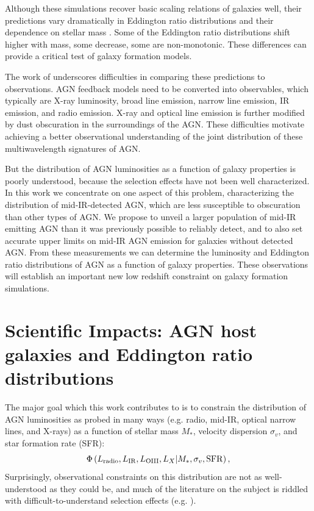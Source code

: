\documentclass[12pt, preprint]{hacked-aastex}
\begin{document}
Although these simulations recover basic scaling relations of galaxies
well, their predictions vary dramatically in Eddington ratio
distributions and their dependence on stellar mass
\cite{habouzit22a}. Some of the Eddington ratio distributions shift
higher with mass, some decrease, some are non-monotonic.  These
differences can provide a critical test of galaxy formation models.

The work of \cite{habouzit22a} underscores difficulties in comparing
these predictions to observations. AGN feedback models need to be
converted into observables, which typically are X-ray luminosity,
broad line emission, narrow line emission, IR emission, and radio
emission. X-ray and optical line emission is further modified by dust
obscuration in the surroundings of the AGN. These difficulties
motivate achieving a better observational understanding of the joint
distribution of these multiwavelength signatures of AGN.

But the distribution of AGN luminosities as a function of galaxy
properties is poorly understood, because the selection effects have
not been well characterized. In this work we concentrate on one aspect
of this problem, characterizing the distribution of mid-IR-detected
AGN, which are less susceptible to obscuration than other types of
AGN.  We propose to unveil a larger population of mid-IR emitting AGN
than it was previously possible to reliably detect, and to also set
accurate upper limits on mid-IR AGN emission for galaxies without
detected AGN. From these measurements we can determine the luminosity
and Eddington ratio distributions of AGN as a function of galaxy
properties.  These observations will establish an important new low
redshift constraint on galaxy formation simulations.

\section{Scientific Impacts: AGN host galaxies and Eddington ratio distributions}\label{sec:impacts}


The major goal which this work contributes to is to constrain the
distribution of AGN luminosities as probed in many ways (e.g. radio,
mid-IR, optical narrow lines, and X-rays) as a function of stellar
mass $M_\ast$, velocity dispersion $\sigma_v$, and star formation rate
(SFR):
\begin{equation}
\label{eq:model}
\Phi\left(L_{\rm radio}, L_{\rm IR}, L_{\rm OIII}, L_X | M_\ast, \sigma_v, {\rm SFR}\right),
\end{equation}
Surprisingly, observational constraints on this distribution are not
as well-understood as they could be, and much of the literature on the
subject is riddled with difficult-to-understand selection effects
(e.g. \cite{trump15a, jones17a, hviding22a}).
\end{document}
